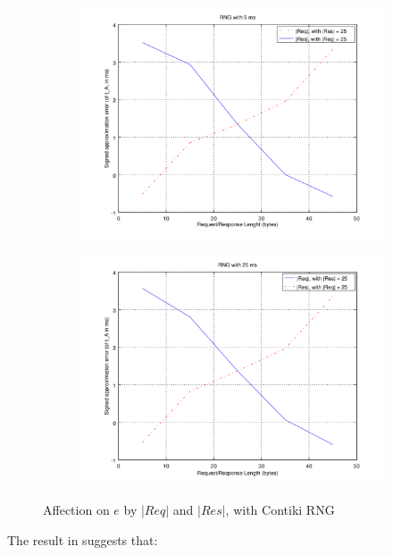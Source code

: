 \begin{figure}[ht!]
	\center
	\begin{subfigure}{0.45\linewidth}
		\center
		\includegraphics[width=\linewidth]{fig/errwithlen5ms.png}
	\end{subfigure}
	\begin{subfigure}{0.45\linewidth}
		\center
		\includegraphics[width=\linewidth]{fig/errwithlen25ms.png}
	\end{subfigure}
	\caption{Affection on $e$ by $|Req|$ and $|Res|$, with Contiki RNG}
	\label{Fig: e by len}
\end{figure}

The result in  suggests that:

